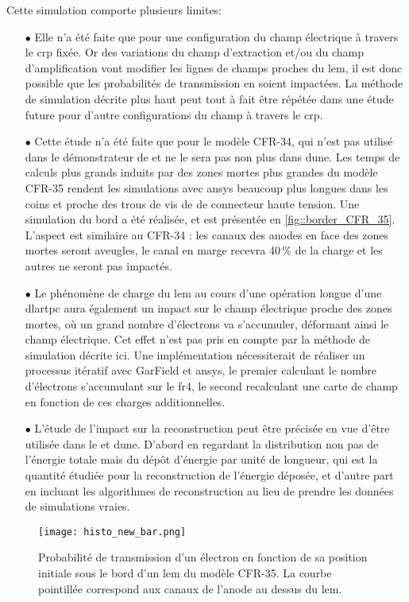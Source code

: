       Cette simulation comporte plusieurs limites:
      \begin{itemize}
        \item[$\bullet$] Elle n'a été faite que pour une configuration du champ électrique à travers le \gls{crp} fixée. Or des variations du champ d'extraction et/ou du champ d'amplification vont modifier les lignes de champs proches du \gls{lem}, il est donc possible que les probabilités de transmission en soient impactées. La méthode de simulation décrite plus haut peut tout à fait être répétée dans une étude future pour d'autre configurations du champ à travers le \gls{crp}.
        \item[$\bullet$] Cette étude n'a été faite que pour le modèle CFR-34, qui n'est pas utilisé dans le démonstrateur de \SSS{} et ne le sera pas non plus dans \gls{dune}. Les temps de calculs plus grands induits par des zones mortes plus grandes du modèle CFR-35 rendent les simulations avec \gls{ansys} beaucoup plus longues dans les coins et proche des trous de vis de de connecteur haute tension. Une simulation du bord a été réalisée, et est présentée en \autoref{fig::border_CFR_35}. L'aspect est similaire au CFR-34 : les canaux des anodes en face des zones mortes seront aveugles, le canal en marge recevra 40\,\% de la charge et les autres ne seront pas impactés.
        \item[$\bullet$] Le phénomène de charge du \gls{lem} au cours d'une opération longue d'une \gls{dlartpc} aura également un impact sur le champ électrique proche des zones mortes, où un grand nombre d'électrons va s'accumuler, déformant ainsi le champ électrique. Cet effet n'est pas pris en compte par la méthode de simulation décrite ici. Une implémentation nécessiterait de réaliser un processus itératif avec GarField et \gls{ansys}, le premier calculant le nombre d'électrons s'accumulant sur le \gls{fr4}, le second recalculant une carte de champ en fonction de ces charges additionnelles.
        \item[$\bullet$] L'étude de l'impact sur la reconstruction peut être précisée en vue d'être utilisée dans le \SSS{} et \gls{dune}. D'abord en regardant la distribution non pas de l'énergie totale mais du dépôt d'énergie par unité de longueur, qui est la quantité étudiée pour la reconstruction de l'énergie déposée, et d'autre part en incluant les algorithmes de reconstruction au lieu de prendre les données de simulations vraies.
      \end{itemize}
      
      \begin{figure}[!htb]
        \centering
        \texttt{[image: histo\_new\_bar.png]}
        \caption[Probabilité de transmission d'un électron en fonction de sa position initiale sous le bord d'un LEM du modèle CFR-35]{\label{fig::border_CFR_35}Probabilité de transmission d'un électron en fonction de sa position initiale sous le bord d'un \gls{lem} du modèle CFR-35. La courbe pointillée correspond aux canaux de l'anode au dessus du \gls{lem}.}
      \end{figure}
        
